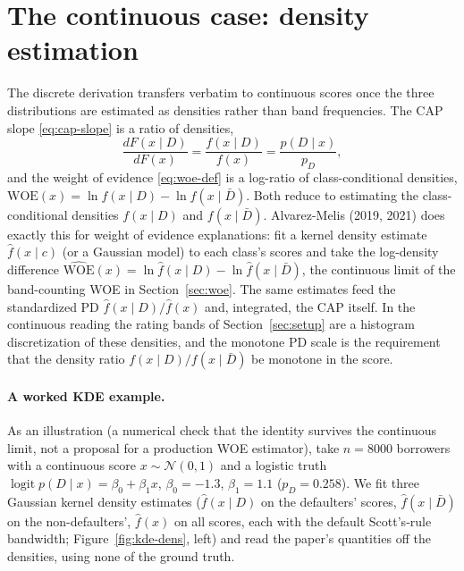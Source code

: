 \documentclass[12pt]{article}
\newcommand{\pD}{p_D}
\newcommand{\PDx}{p(D \mid x)}
\newcommand{\WOE}{\mathrm{WOE}}
\begin{document}
\section{The continuous case: density estimation}\label{sec:continuous}

The discrete derivation transfers verbatim to continuous scores once the three distributions
are estimated as densities rather than band frequencies. The CAP slope \eqref{eq:cap-slope} is
a ratio of densities,
\begin{equation}
\frac{dF(x\mid D)}{dF(x)}=\frac{f(x\mid D)}{f(x)}=\frac{\PDx}{\pD},
\end{equation}
and the weight of evidence \eqref{eq:woe-def} is a log-ratio of class-conditional densities,
$\WOE(x)=\ln f(x\mid D)-\ln f(x\mid\bar D)$. Both reduce to estimating the class-conditional
densities $f(x\mid D)$ and $f(x\mid\bar D)$. Alvarez-Melis (2019, 2021) does exactly this for
weight of evidence explanations: fit a kernel density estimate $\hat f(x\mid c)$ (or a Gaussian
model) to each class's scores and take the log-density difference $\widehat{\WOE}(x)=\ln\hat
f(x\mid D)-\ln\hat f(x\mid\bar D)$, the continuous limit of the band-counting WOE in
Section~\ref{sec:woe}. The same
estimates feed the standardized PD $\hat f(x\mid D)/\hat f(x)$ and, integrated, the CAP itself.
In the continuous reading the rating bands of Section~\ref{sec:setup} are a histogram
discretization of these densities, and the monotone PD scale is the requirement that the
density ratio $f(x\mid D)/f(x\mid\bar D)$ be monotone in the score.

\paragraph{A worked KDE example.} As an illustration (a numerical check that the identity
survives the continuous limit, not a proposal for a production WOE estimator), take $n=8000$
borrowers with a continuous score $x\sim\mathcal N(0,1)$ and a logistic truth
$\operatorname{logit}p(D\mid x)=\beta_0+\beta_1 x$, $\beta_0=-1.3$, $\beta_1=1.1$
($\pD=0.258$). We fit three Gaussian kernel density estimates ($\hat f(x\mid D)$ on the
defaulters' scores, $\hat f(x\mid\bar D)$ on the non-defaulters', $\hat f(x)$ on all scores, each with
the default Scott's-rule bandwidth; Figure~\ref{fig:kde-dens}, left) and read the paper's
quantities off the densities, using none of the ground truth.
\end{document}
